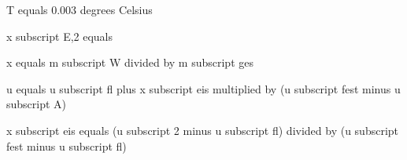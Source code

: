 T equals 0.003 degrees Celsius  

x subscript E,2 equals  

x equals m subscript W divided by m subscript ges  

u equals u subscript fl plus x subscript eis multiplied by (u subscript fest minus u subscript A)  

x subscript eis equals (u subscript 2 minus u subscript fl) divided by (u subscript fest minus u subscript fl)
